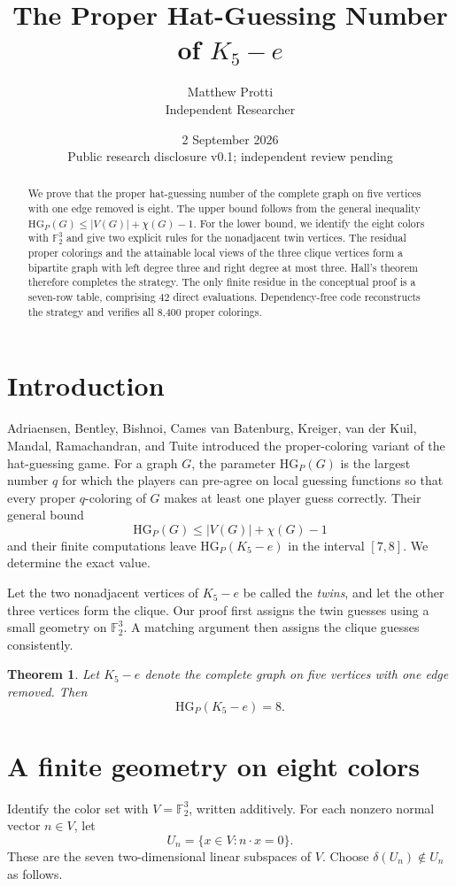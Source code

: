 \documentclass[11pt]{article}
\title{The Proper Hat-Guessing Number of $K_5-e$}
\author{Matthew Protti\\\small Independent Researcher}
\date{2 September 2026\\\small Public research disclosure v0.1; independent review pending}
\newtheorem{theorem}{Theorem}
\newcommand{\F}{\mathbb{F}}
\newcommand{\HGP}{\mathrm{HG}_{P}}
\begin{document}
\maketitle

\begin{abstract}
We prove that the proper hat-guessing number of the complete graph on five
vertices with one edge removed is eight. The upper bound follows from the
general inequality $\HGP(G)\le |V(G)|+\chi(G)-1$. For the lower bound, we
identify the eight colors with $\F_2^3$ and give two explicit rules for the
nonadjacent twin vertices. The residual proper colorings and the attainable
local views of the three clique vertices form a bipartite graph with left
degree three and right degree at most three. Hall's theorem therefore
completes the strategy. The only finite residue in the conceptual proof is a
seven-row table, comprising 42 direct evaluations. Dependency-free code
reconstructs the strategy and verifies all 8,400 proper colorings.
\end{abstract}

\section{Introduction}
Adriaensen, Bentley, Bishnoi, Cames van Batenburg, Kreiger, van der Kuil,
Mandal, Ramachandran, and Tuite introduced the proper-coloring variant of the
hat-guessing game. For a graph $G$, the parameter $\HGP(G)$ is the largest
number $q$ for which the players can pre-agree on local guessing functions so
that every proper $q$-coloring of $G$ makes at least one player guess
correctly. Their general bound
\[
   \HGP(G)\le |V(G)|+\chi(G)-1
\]
and their finite computations leave $\HGP(K_5-e)$ in the interval $[7,8]$.
We determine the exact value.

Let the two nonadjacent vertices of $K_5-e$ be called the \emph{twins}, and
let the other three vertices form the clique. Our proof first assigns the
twin guesses using a small geometry on $\F_2^3$. A matching argument then
assigns the clique guesses consistently.

\begin{theorem}\label{thm:main}
Let $K_5-e$ denote the complete graph on five vertices with one edge removed.
Then
\[
   \HGP(K_5-e)=8.
\]
\end{theorem}

\section{A finite geometry on eight colors}
Identify the color set with $V=\F_2^3$, written additively. For each nonzero
normal vector $n\in V$, let
\[
  U_n=\{x\in V:n\cdot x=0\}.
\]
These are the seven two-dimensional linear subspaces of $V$. Choose
$\delta(U_n)\notin U_n$ as follows.
\end{document}
